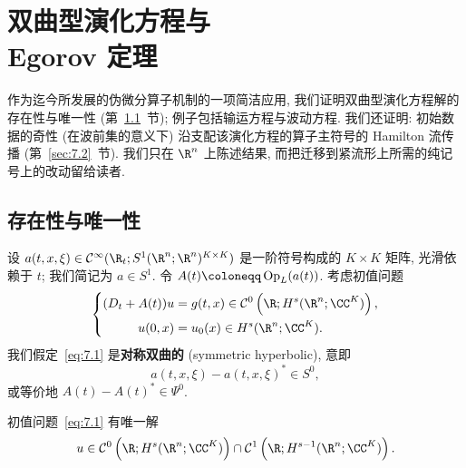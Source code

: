 
\chapter[双曲型演化方程与 Egorov 定理]{双曲型演化方程与\\Egorov 定理}\label{ch:07}
%
%

作为迄今所发展的伪微分算子机制的一项简洁应用, 我们证明双曲型演化方程解的存在性与唯一性 (第~\ref{sec:7.1}~节); 例子包括输运方程与波动方程. 我们还证明: 初始数据的奇性 (在波前集的意义下) 沿支配该演化方程的算子主符号的 Hamilton 流传播 (第~\ref{sec:7.2}~节). 我们只在 $\R^n$ 上陈述结果, 而把迁移到紧流形上所需的纯记号上的改动留给读者.

\section{存在性与唯一性}\label{sec:7.1}
%
%

设 $a(t, x, \xi) \in \Smooth(\R_t; S^1(\R^n; \R^n)^{K \times K})$ 是一阶符号构成的 $K \times K$ 矩阵, 光滑依赖于 $t$; 我们简记为 $a \in S^1$. 令 $A(t) \defeq \Op_L(a(t))$. 考虑初值问题
\begin{equation}\label{eq:7.1}
    \left\{
    \begin{aligned}
        (D_t + A(t)) u &= g(t, x) \in \mathcal{C}^0\left( \R; H^s(\R^n; \CC^K) \right), \\
        u(0, x) &= u_0(x) \in H^s(\R^n; \CC^K).
    \end{aligned}
    \right.
\end{equation}
我们假定~\eqref{eq:7.1} 是\textbf{对称双曲的} (symmetric hyperbolic), 意即
\begin{equation}\label{eq:7.2}
    a(t, x, \xi) - a(t, x, \xi)^* \in S^0,
\end{equation}
或等价地 $A(t) - A(t)^* \in \Psi^0$.

\begin{theorem}[一阶对称双曲系统解的存在性与唯一性]\label{thm:7.1}
初值问题~\eqref{eq:7.1} 有唯一解
\begin{equation}\label{eq:7.3}
    u \in \mathcal{C}^0\left( \R; H^s(\R^n; \CC^K) \right) \cap \mathcal{C}^1\left( \R; H^{s-1}(\R^n; \CC^K) \right).
\end{equation}
\end{theorem}

